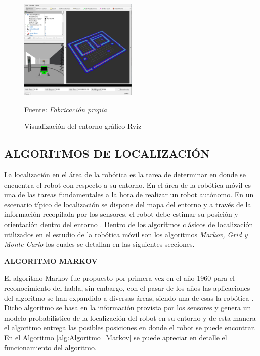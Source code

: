 \begin{figure}[h]
    \centering
    \includegraphics[width=0.5\textwidth]{figures/02marco_conceptual/Rviz.PNG}
    \caption{\label{fig:ROS_rviz} Visualización del entorno gráfico Rviz} 
    Fuente: \textit{Fabricación propia}
    \end{figure}
    
\newpage
\subsection{ALGORITMOS DE LOCALIZACIÓN}
La localización en el área de la robótica es la tarea de determinar en donde se encuentra el robot con respecto a su entorno. En el área de la robótica móvil es una de las tareas fundamentales a la hora de realizar un robot autónomo. En un escenario típico de localización se dispone del mapa del entorno y a través de la información recopilada por los sensores, el robot debe estimar su posición y orientación dentro del entorno \cite{huang_robot_2016}. Dentro de los algoritmos clásicos de localización utilizados en el estudio de la robótica móvil son los algoritmos \textit{Markov, Grid y Monte Carlo} los cuales se detallan en las siguientes secciones.


\textbf{ALGORITMO MARKOV}

El algoritmo Markov fue propuesto por primera vez en el año 1960 para el reconocimiento del habla, sin embargo, con el pasar de los años las aplicaciones del algoritmo se han expandido a diversas áreas, siendo una de esas la robótica \cite{reyes_mobile_2015}. Dicho algoritmo se basa en la información provista por los sensores y genera un modelo probabilístico de la localización del robot en su entorno y de esta manera el algoritmo entrega las posibles posiciones en donde el robot se puede encontrar. En el Algoritmo  \ref{alg:Algoritmo_Markov} se puede apreciar en detalle el funcionamiento del algoritmo.

